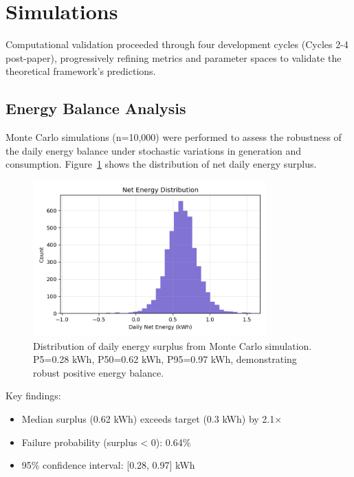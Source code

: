 \section{Simulations}
\label{sec:simulations}

Computational validation proceeded through four development cycles (Cycles 2-4 post-paper), progressively refining metrics and parameter spaces to validate the theoretical framework's predictions.

\subsection{Energy Balance Analysis}

Monte Carlo simulations (n=10,000) were performed to assess the robustness of the daily energy balance under stochastic variations in generation and consumption. Figure~\ref{fig:energy_surplus} shows the distribution of net daily energy surplus.

\begin{figure}[H]
    \centering
    \includegraphics[width=0.8\textwidth]{figures/simulations/energy_surplus_hist.png}
    \caption{Distribution of daily energy surplus from Monte Carlo simulation. P5=0.28 kWh, P50=0.62 kWh, P95=0.97 kWh, demonstrating robust positive energy balance.}
    \label{fig:energy_surplus}
\end{figure}

Key findings:
\begin{itemize}
    \item Median surplus (0.62 kWh) exceeds target (0.3 kWh) by 2.1×
    \item Failure probability (surplus < 0): 0.64\%
    \item 95\% confidence interval: [0.28, 0.97] kWh
\end{itemize}

